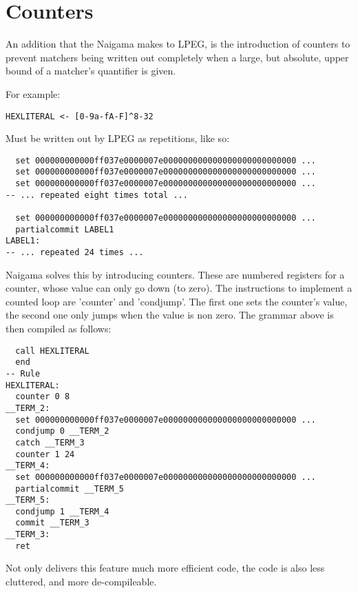 \section{Counters}

An addition that the Naigama makes to LPEG, is the introduction
of counters to prevent matchers being written out completely
when a large, but absolute, upper bound of a matcher's quantifier
is given.

For example:

\begin{myquote}
\begin{verbatim}
HEXLITERAL <- [0-9a-fA-F]^8-32

\end{verbatim}
\end{myquote}

Must be written out by LPEG as repetitions, like so:

\begin{myquote}
\begin{verbatim}
  set 000000000000ff037e0000007e000000000000000000000000000 ...
  set 000000000000ff037e0000007e000000000000000000000000000 ...
  set 000000000000ff037e0000007e000000000000000000000000000 ...
-- ... repeated eight times total ...

  set 000000000000ff037e0000007e000000000000000000000000000 ...
  partialcommit LABEL1
LABEL1:
-- ... repeated 24 times ...

\end{verbatim}
\end{myquote}

Naigama solves this by introducing counters. These are numbered
registers for a counter, whose value can only go down (to zero).
The instructions to implement a counted loop are
'counter' and 'condjump'. The first one sets the counter's value,
the second one only jumps when the value is non zero.
The grammar above is then compiled as follows:

\begin{myquote}
\begin{verbatim}
  call HEXLITERAL
  end
-- Rule
HEXLITERAL:
  counter 0 8
__TERM_2:
  set 000000000000ff037e0000007e000000000000000000000000000 ...
  condjump 0 __TERM_2
  catch __TERM_3
  counter 1 24
__TERM_4:
  set 000000000000ff037e0000007e000000000000000000000000000 ...
  partialcommit __TERM_5
__TERM_5:
  condjump 1 __TERM_4
  commit __TERM_3
__TERM_3:
  ret

\end{verbatim}
\end{myquote}

Not only delivers this feature much more efficient code, the code
is also less cluttered, and more de-compileable.
